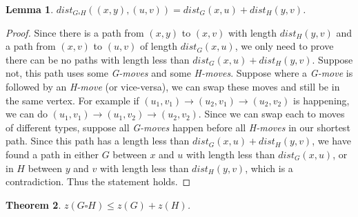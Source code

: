 \documentclass[1p]{elsarticle}
\newtheorem{theorem}{Theorem}
\newtheorem{lemma}[theorem]{Lemma}
\begin{document}
\begin{lemma} \label{shortestpathlemma}
	$dist_{G \square H}((x,y),(u,v)) = dist_G(x,u) + dist_H(y,v)$.
\end{lemma}
\begin{proof}
	Since there is a path from $(x,y)$ to $(x,v)$ with length $dist_H(y,v)$ and a path from $(x,v)$ to $(u,v)$ of length
	$dist_G(x,u)$, we only need to prove there can be no paths with length less than $dist_G(x,u) + dist_H(y,v)$.
	Suppose not, this path uses some {\it G-moves} and some {\it H-moves}. Suppose where a {\it G-move} is followed by
	an {\it H-move} (or vice-versa), we can swap these moves and still be in the same vertex. For example if $(u_1,v_1)
	\rightarrow (u_2,v_1) \rightarrow (u_2,v_2)$ is happening, we can do $(u_1,v_1) \rightarrow (u_1,v_2) \rightarrow
	(u_2,v_2)$. Since we can swap each to moves of different types, suppose all {\it G-moves} happen before all {\it
	H-moves} in our shortest path. Since this path has a length less than $dist_G(x,u) + dist_H(y,v)$, we have found a
	path in either $G$ between $x$ and $u$ with length less than $dist_G(x,u)$, or in $H$ between $y$ and $v$ with
	length less than $dist_H(y,v)$, which is a contradiction. Thus the statement holds.
\end{proof}




\begin{theorem}
	$z(G \square H) \leq z(G) + z(H)$.
\end{theorem}
\end{document}
